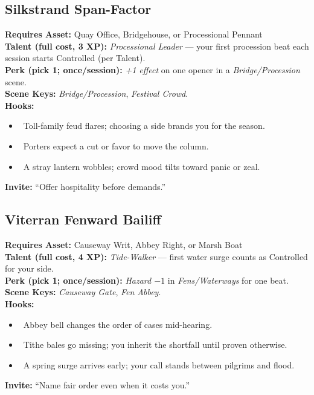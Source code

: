 \documentclass[11pt]{article}
\begin{document}
\subsection*{Silkstrand Span-Factor}
\textbf{Requires Asset:} Quay Office, Bridgehouse, or Processional Pennant\\
\textbf{Talent (full cost, 3 XP):} \emph{Processional Leader} — your first procession beat each session starts Controlled (per Talent).\\
\textbf{Perk (pick 1; once/session):} \emph{+1 effect} on one opener in a \emph{Bridge/Procession} scene.\\
\textbf{Scene Keys:} \emph{Bridge/Procession}, \emph{Festival Crowd}.\\[2pt]
\textbf{Hooks:}
\begin{itemize}
  \item \heartsuit~Toll-family feud flares; choosing a side brands you for the season.
  \item \diamondsuit~Porters expect a cut or favor to move the column.
  \item \spadesuit~A stray lantern wobbles; crowd mood tilts toward panic or zeal.
\end{itemize}
\textbf{Invite:} “Offer hospitality before demands.”

\subsection*{Viterran Fenward Bailiff}
\textbf{Requires Asset:} Causeway Writ, Abbey Right, or Marsh Boat\\
\textbf{Talent (full cost, 4 XP):} \emph{Tide-Walker} — first water surge counts as Controlled for your side.\\
\textbf{Perk (pick 1; once/session):} \emph{Hazard $-1$} in \emph{Fens/Waterways} for one beat.\\
\textbf{Scene Keys:} \emph{Causeway Gate}, \emph{Fen Abbey}.\\[2pt]
\textbf{Hooks:}
\begin{itemize}
  \item \clubsuit~Abbey bell changes the order of cases mid-hearing.
  \item \diamondsuit~Tithe bales go missing; you inherit the shortfall until proven otherwise.
  \item \spadesuit~A spring surge arrives early; your call stands between pilgrims and flood.
\end{itemize}
\textbf{Invite:} “Name fair order even when it costs you.”
\end{document}
